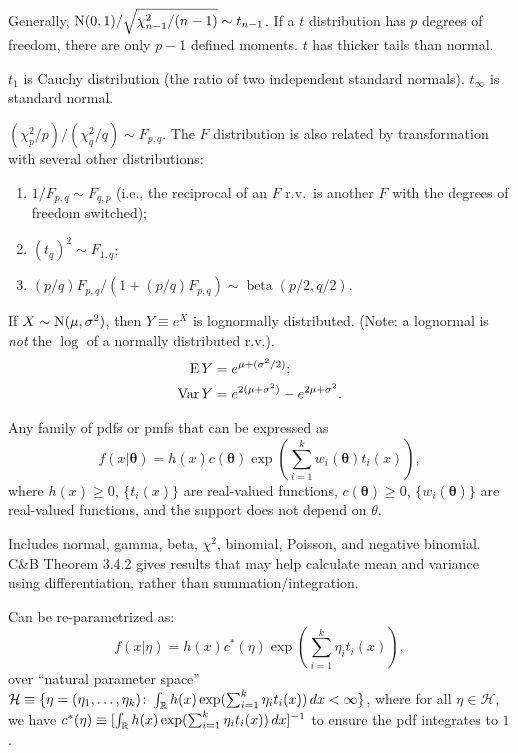 \documentclass[8pt,letterpaper, landscape]{extarticle} %
\begin{document}
\begin{multicols}{3}
\begin{description}
Generally, $ \operatorname{N} (0,1) / \sqrt{\chi^2_{n-1} / (n-1)} \sim t_{n-1} $. If a $ t $ distribution has $ p $ degrees of freedom, there are only $ p-1 $ defined moments. $ t $ has thicker tails than normal.

$ t_1 $ is Cauchy distribution (the ratio of two independent standard normals). $ t_\infty $ is standard normal.

 $ (\chi^2_p / p) / (\chi^2_q / q) \sim F_{p, q} $. The $ F $ distribution is also related by transformation with several other distributions:
\begin{enumerate}
\item $ 1 / F_{p,q} \sim F_{q, p}  $ (i.e., the reciprocal of an $ F $ r.v.\ is another $ F $ with the degrees of freedom switched);
\item $ (t_q)^2 \sim F_{1,q} $;
\item $ (p/q) F_{p,q} / (1 + (p/q) F_{p,q}) \sim \operatorname{beta} (p/2, q/2) $.
\end{enumerate}

 If $ X \sim \operatorname{N} (\mu, \sigma^2) $, then $ Y \equiv e^X $ is lognormally distributed. (Note: a lognormal is \textit{not} the $ \log $ of a normally distributed r.v.).
\begin{align*}
\operatorname{E} Y &= e^{\mu + (\sigma^2 / 2)}; \\
\operatorname{Var} Y &= e^{2(\mu + \sigma^2)} - e^{2 \mu + \sigma^2} .
\end{align*}

 Any family of pdfs or pmfs that can be expressed as
$$ f(x | \mathbf{\theta}) = h(x) c(\mathbf{\theta}) \exp \left( \sum_{i=1}^{k} w_i (\mathbf{\theta}) t_i (x) \right), $$
where $ h(x) \geq 0 $, $ \{ t_i(x) \} $ are real-valued functions, $ c(\mathbf{\theta}) \geq 0 $, $ \{ w_i (\mathbf{\theta}) \} $ are real-valued functions, and the support does not depend on $ \theta $.

Includes normal, gamma, beta, $ \chi^2 $, binomial, Poisson, and negative binomial. C\&B Theorem 3.4.2 gives results that may help calculate mean and variance using differentiation, rather than summation/integration.

Can be re-parametrized as:
$$ f(x | \eta) = h(x) c^* (\eta) \exp \left( \sum_{i=1}^{k} \eta_i t_i (x) \right), $$
over ``natural parameter space'' $ \mathcal{H} \equiv \{ \eta = (\eta_1, \dotsc , \eta_k) \colon \int_{\mathbb{R}} h(x) \exp(\sum_{i=1}^{k} \eta_i t_i(x)) \, dx < \infty \} $, where for all $ \eta \in \mathcal{H} $, we have $ c^* (\eta) \equiv [ \int_{\mathbb{R}} h(x) \exp(\sum_{i=1}^{k} \eta_i t_i(x)) \, dx ]^{-1} $ to ensure the pdf integrates to $ 1 $.


\end{description}
\end{multicols}
\end{document}
